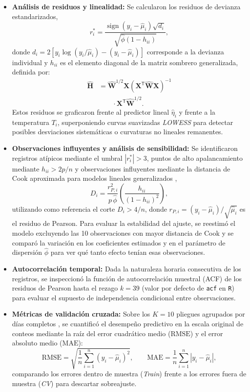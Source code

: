 \documentclass[12pt, a4paper]{article}
\numberwithin{equation}{section}
\begin{document}
\begin{itemize}
    \item \textbf{Análisis de residuos y linealidad:} Se calcularon los residuos de devianza estandarizados,
    \[
    r_i^* = \frac{\operatorname{sign}(y_i - \widehat{\mu}_i)\sqrt{d_i}}{\sqrt{\widehat{\phi}(1 - h_{ii})}},
    \]
    donde $d_i = 2\left[y_i\log(y_i/\widehat{\mu}_i) - (y_i - \widehat{\mu}_i)\right]$ corresponde a la devianza individual y $h_{ii}$ es el elemento diagonal de la matriz sombrero generalizada, definida por:
    \begin{align*}
    \widehat{\mathbf{H}} &= \widehat{\mathbf{W}}^{1/2}\mathbf{X}(\mathbf{X}^{\mathsf T}\widehat{\mathbf{W}}\mathbf{X})^{-1}\\
    &\qquad\cdot \mathbf{X}^{\mathsf T}\widehat{\mathbf{W}}^{1/2}.
    \end{align*}
    Estos residuos se graficaron frente al predictor lineal $\widehat{\eta}_i$ y frente a la temperatura $T_i$, superponiendo curvas suavizadas \textit{LOWESS} para detectar posibles desviaciones sistemáticas o curvaturas no lineales remanentes.

    \item \textbf{Observaciones influyentes y análisis de sensibilidad:} Se identificaron registros atípicos mediante el umbral $|r_i^*| > 3$, puntos de alto apalancamiento mediante $h_{ii} > 2p/n$ y observaciones influyentes mediante la distancia de Cook aproximada para modelos lineales generalizados \cite{dunn},
    \[
    D_i = \frac{r_{P,i}^2}{p\,\widehat{\phi}}\left(\frac{h_{ii}}{(1 - h_{ii})^2}\right),
    \]
    utilizando como referencia el corte $D_i > 4/n$, donde $r_{P,i} = (y_i - \widehat{\mu}_i)/\sqrt{\widehat{\mu}_i}$ es el residuo de Pearson. Para evaluar la estabilidad del ajuste, se reestimó el modelo excluyendo las 10 observaciones con mayor distancia de Cook y se comparó la variación en los coeficientes estimados y en el parámetro de dispersión $\widehat{\phi}$ para ver qué tanto efecto tenían esas observaciones.

    \item \textbf{Autocorrelación temporal:} Dada la naturaleza horaria consecutiva de los registros, se inspeccionó la función de autocorrelación muestral (ACF) de los residuos de Pearson hasta el rezago $k = 39$ (valor por defecto de \texttt{acf} en \texttt{R}) para evaluar el supuesto de independencia condicional entre observaciones.

    \item \textbf{Métricas de validación cruzada:} Sobre los $K = 10$ pliegues agrupados por días completos \cite{roberts}, se cuantificó el desempeño predictivo en la escala original de conteos mediante la raíz del error cuadrático medio ($\text{RMSE}$) y el error absoluto medio ($\text{MAE}$):
    \[
    \text{RMSE} = \sqrt{\frac{1}{n}\sum_{i=1}^n (y_i - \widehat{\mu}_i)^2}, \qquad
    \text{MAE} = \frac{1}{n}\sum_{i=1}^n |y_i - \widehat{\mu}_i|,
    \]
    comparando los errores dentro de muestra (\textit{Train}) frente a los errores fuera de muestra (\textit{CV}) para descartar sobreajuste.
\end{itemize}
\FloatBarrier
\end{document}
